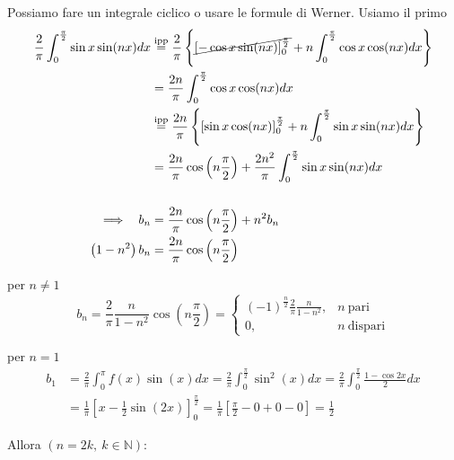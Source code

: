 \begin{enumerate}
Possiamo fare un integrale ciclico o usare le formule di Werner. Usiamo il primo\begin{align*}
\frac{2}{\pi }\int ^{\frac{\pi }{2}}_{0}\sin x\sin( nx) dx & \overset{\text{ipp}}{=}\frac{2}{\pi }\left\{\cancel{[ -\cos x\sin( nx)]^{\frac{\pi }{2}}_{0}} +n\int ^{\frac{\pi }{2}}_{0}\cos x\cos( nx) dx\right\}\\
 & =\frac{2n}{\pi }\int ^{\frac{\pi }{2}}_{0}\cos x\cos( nx) dx\\
 & \overset{\text{ipp}}{=}\frac{2n}{\pi }\left\{[\sin x\cos( nx)]^{\frac{\pi }{2}}_{0} +n\int ^{\frac{\pi }{2}}_{0}\sin x\sin( nx) dx\right\}\\
 & =\frac{2n}{\pi }\cos\left( n\frac{\pi }{2}\right) +\frac{2n^{2}}{\pi }\int ^{\frac{\pi }{2}}_{0}\sin x\sin( nx) dx\\
 & \\
\implies \ \ b_{n} & =\frac{2n}{\pi }\cos\left( n\frac{\pi }{2}\right) +n^{2} b_{n}\\
\left( 1-n^{2}\right) b_{n} & =\frac{2n}{\pi }\cos\left( n\frac{\pi }{2}\right)
\end{align*}

per $n\neq 1$\begin{equation*}
b_{n} =\frac{2}{\pi }\frac{n}{1-n^{2}}\cos\left( n\frac{\pi }{2}\right) =\begin{cases}
( -1)^{\frac{n}{2}}\frac{2}{\pi }\frac{n}{1-n^{2}} , & n\ \text{pari}\\
0, & n\ \text{dispari}
\end{cases}
\end{equation*}

per $n=1$\begin{equation*}
\begin{aligned}
b_{1} & =\frac{2}{\pi }\int ^{\pi }_{0} f( x)\sin( x) dx=\frac{2}{\pi }\int ^{\frac{\pi }{2}}_{0}\sin^{2}( x) dx=\frac{2}{\pi }\int ^{\frac{\pi }{2}}_{0}\frac{1-\cos 2x}{2} dx\\
 & =\frac{1}{\pi }\left[ x-\frac{1}{2}\sin( 2x)\right]^{\frac{\pi }{2}}_{0} =\frac{1}{\pi }\left[\frac{\pi }{2} -0+0-0\right] =\frac{1}{2}
\end{aligned}
\end{equation*}

Allora $( n=2k,\ k\in \mathbb{N})$:


\end{enumerate}

